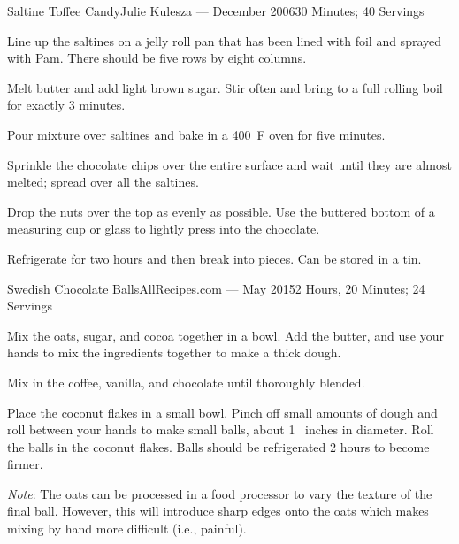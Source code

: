 \documentclass{article}
\begin{document}
\begin{recipe}{Saltine Toffee Candy}{Julie Kulesza --- December 2006}{30 Minutes; 40 Servings}

   Line up the saltines on a jelly roll pan that has been lined with foil and
   sprayed with Pam.  There should be five rows by eight columns.

   Melt butter and add light brown sugar.  Stir often and bring to a full
   rolling boil for exactly 3 minutes.

   \newstep
   Pour mixture over saltines and bake in a 400\ \0F oven for five minutes.

   Sprinkle the chocolate chips over the entire surface and wait until they are
   almost melted; spread over all the saltines.

   Drop the nuts over the top as evenly as possible. Use the buttered bottom of
   a measuring cup or glass to lightly press into the chocolate.

   \newstep
   Refrigerate for two hours and then break into pieces.  Can be stored in a
   tin.

\end{recipe}
 
\begin{recipe}{Swedish Chocolate Balls}{\href{http://www.allrecipes.com/recipe/swedish-chocolate-balls-or-coconut-balls/}{AllRecipes.com} --- May 2015}{2 Hours, 20 Minutes; 24 Servings}

   Mix the oats, sugar, and cocoa together in a bowl. Add the butter, and use your
   hands to mix the ingredients together to make a thick dough. 
   
   Mix in the coffee, vanilla, and chocolate until thoroughly blended.
   
   Place the coconut flakes in a small bowl. Pinch off small amounts of dough and
   roll between your hands to make small balls, about 1\  inches in diameter.
   Roll the balls in the coconut flakes. Balls should be refrigerated 2 hours to
   become firmer.
   
   \freeform 
   \emph{Note}: The oats can be processed in a food processor to vary the
   texture of the final ball.  However, this will introduce sharp edges onto
   the oats which makes mixing by hand more difficult (i.e., painful).

\end{recipe}
\end{document}
